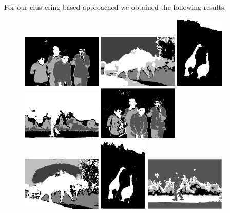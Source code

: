 \documentclass[11pt, twoside]{article}
\begin{document}
For our clustering based approached we obtained the following results:

\begin{figure}[ht]
    \centering
    \includegraphics[width=1.5in]{290035_k4_l0}
    \includegraphics[width=1.5in]{296028_k5_l0}
    \includegraphics[width=0.9in]{289011_k2_l0}    
    \includegraphics[width=1.5in]{285022_k4_l0}
    \includegraphics[width=1.5in]{290035_k4}
    \includegraphics[width=1.5in]{296028_k5}
    \includegraphics[width=0.9in]{289011_k2}
    \includegraphics[width=1.5in]{285022_k4}


\end{figure}
\end{document}
